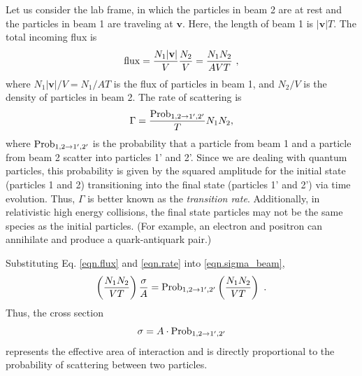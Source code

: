 Let us consider the lab frame, in which the particles in beam 2 are at rest and the particles in beam 1 are traveling at $\mathbf{v}$. Here, the length of beam 1 is $|\mathbf{v}|T$. The total incoming flux is
\begin{equation}
    {\rm flux} = \frac{N_1|\mathbf{v}|}{V}\frac{N_2}{V} = \frac{N_1N_2}{AVT} \ ,
    \label{eqn.flux}
\end{equation}
where $N_1|\mathbf{v}|/V = N_1/AT$ is the flux of particles in beam 1, and $N_2/V$ is the density of particles in beam 2. The rate of scattering is
\begin{equation}
    \Gamma = \frac{{\rm Prob}_{1,2\rightarrow1',2'}}{T}N_1N_2,
    \label{eqn.rate}
\end{equation}
where ${\rm Prob}_{1,2\rightarrow1',2'}$ is the probability that a particle from beam 1 and a particle from beam 2 scatter into particles 1' and 2'. Since we are dealing with quantum particles, this probability is given by the squared amplitude for the initial state (particles 1 and 2) transitioning into the final state (particles 1' and 2') via time evolution. Thus, $\Gamma$ is better known as the {\it transition rate}. Additionally, in relativistic high energy collisions, the final state particles may not be the same species as the initial particles. (For example, an electron and positron can annihilate and produce a quark-antiquark pair.)

Substituting Eq. \eqref{eqn.flux} and \ref{eqn.rate} into \ref{eqn.sigma_beam},
\begin{equation}
    \left(\frac{N_1N_2}{VT}\right) \frac{\sigma}{A} = {\rm Prob}_{1,2\rightarrow1',2'}\left(\frac{N_1N_2}{VT}\right) \ .
\end{equation}
Thus, the cross section
\begin{equation}
    \sigma = A \cdot {\rm Prob}_{1,2\rightarrow1',2'}
\end{equation}
represents the effective area of interaction and is directly proportional to the probability of scattering between two particles. 

